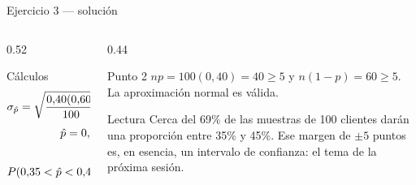 \documentclass[aspectratio=169,10pt]{beamer}
\begin{document}
\begin{frame}{Ejercicio 3 — solución}
  \begin{columns}[T,onlytextwidth]
    \begin{column}{0.52\textwidth}
      \begin{block}{Cálculos}
        \footnotesize
        \[ \sigma_{\hat p}=\sqrt{\frac{0{,}40(0{,}60)}{100}}
           =\sqrt{0{,}0024}=\azul{0{,}0490} \]
        \begin{align*}
          \hat p=0{,}45 &\Rightarrow z=\tfrac{0{,}05}{0{,}0490}=1{,}02\\
          &\Rightarrow P(\hat p>0{,}45)=\azul{0{,}1537}\\[0.2em]
          P(0{,}35<\hat p<0{,}45)&=\azul{0{,}6926}
        \end{align*}
      \end{block}
    \end{column}
    \begin{column}{0.44\textwidth}
      \begin{exampleblock}{Punto 2}
        \footnotesize
        $np=100(0{,}40)=40\ge 5$ y $n(1-p)=60\ge 5$. La aproximación normal es
        válida.
      \end{exampleblock}
      \begin{alertblock}{Lectura}
        \footnotesize
        Cerca del 69\% de las muestras de 100 clientes darán una proporción
        entre 35\% y 45\%. Ese margen de $\pm 5$ puntos es, en esencia, un
        intervalo de confianza: el tema de la próxima sesión.
      \end{alertblock}
    \end{column}
  \end{columns}
\end{frame}
\end{document}
